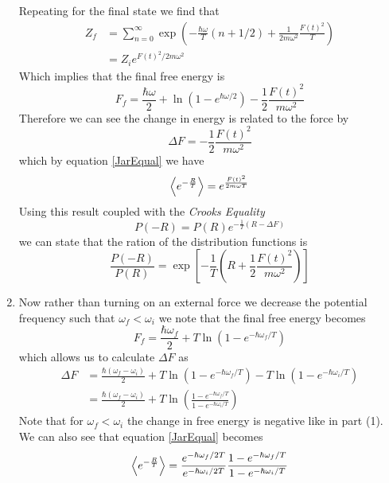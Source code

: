 \documentclass[11pt]{article}
\numberwithin{equation}{section}
\begin{document}
\begin{enumerate}[(1)]
Repeating for the final state we find that
\begin{align*}
Z_f &= \sum_{n=0}^{\infty}\exp\left(-\frac{\hbar\omega}{T}(n+1/2)+\frac{1}{2m\omega^2}\frac{F(t)^2}{T}\right)\\
&= Z_ie^{F(t)^2/2m\omega^2}
\end{align*}
Which implies that the final free energy is
$$F_f = \frac{\hbar\omega}{2} + \ln\left(1-e^{\hbar\omega/2}\right) - \frac{1}{2}\frac{F(t)^2}{m\omega^2}$$
Therefore we can see the change in energy is related to the force by
$$\Delta{F} = -\frac{1}{2}\frac{F(t)^2}{m\omega^2}$$
which by equation \ref{JarEqual} we have
$$\left\langle{e^{-\frac{R}{T}}}\right\rangle = e^{\frac{F(t)^2}{2m\omega{T}}}$$
Using this result coupled with the \emph{Crooks Equality}
\begin{equation}
P(-R) = P(R)e^{-\frac{1}{T}(R-\Delta{F})}
\label{CrooksEqual}
\end{equation}
we can state that the ration of the distribution functions is
$$\frac{P(-R)}{P(R)} = \exp\left[-\frac{1}{T}\left(R+\frac{1}{2}\frac{F(t)^2}{m\omega^2}\right)\right]$$

\item Now rather than turning on an external force we decrease the potential frequency such
that $\omega_f<\omega_i$ we note that the final free energy becomes
$$F_f = \frac{\hbar\omega_f}{2} + T\ln\left(1-e^{-\hbar\omega_f/T}\right)$$
which allows us to calculate $\Delta{F}$ as
\begin{align*}
\Delta{F} &= \frac{\hbar(\omega_f-\omega_i)}{2} + T\ln\left(1-e^{-\hbar\omega_f/T}\right) - T\ln\left(1-e^{-\hbar\omega_i/T}\right)\\
&= \frac{\hbar(\omega_f-\omega_i)}{2} + T\ln\left(\frac{1-e^{-\hbar\omega_f/T}}{1-e^{-\hbar\omega_i/T}}\right)
\end{align*}
Note that for $\omega_f<\omega_i$ the change in free energy is negative like in part (1). We
can also see that equation \ref{JarEqual} becomes
$$\left\langle{e^{-\frac{R}{T}}}\right\rangle = \frac{e^{-\hbar\omega_f/2T}}{e^{-\hbar\omega_i/2T}}\frac{1-e^{-\hbar\omega_f/T}}{1-e^{-\hbar\omega_i/T}}$$
\end{enumerate}

\pagebreak
\end{document}
